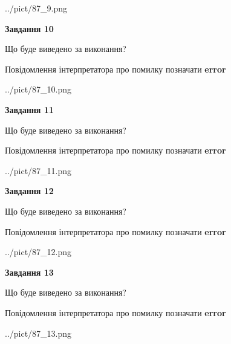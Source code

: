 \documentclass[11pt, ukrainian]{article}
\begin{document}
{\begin {large}
\begin{center}
	{../pict/87_9.png}
\end{center}
\newpage

{\begin {center}\textbf{Завдання 10}\end {center}}\par
Що буде виведено за виконання? \par
Повідомлення інтерпретатора про помилку позначати \textbf{error}

\begin{center}
	{../pict/87_10.png}
\end{center}
\newpage

{\begin {center}\textbf{Завдання 11}\end {center}}\par
Що буде виведено за виконання? \par
Повідомлення інтерпретатора про помилку позначати \textbf{error}

\begin{center}
	{../pict/87_11.png}
\end{center}
\newpage

{\begin {center}\textbf{Завдання 12}\end {center}}\par
Що буде виведено за виконання? \par
Повідомлення інтерпретатора про помилку позначати \textbf{error}

\begin{center}
	{../pict/87_12.png}
\end{center}
\newpage

{\begin {center}\textbf{Завдання 13}\end {center}}\par
Що буде виведено за виконання? \par
Повідомлення інтерпретатора про помилку позначати \textbf{error}

\begin{center}
	{../pict/87_13.png}
\end{center}
\newpage


\end{large}}
\end{document}
